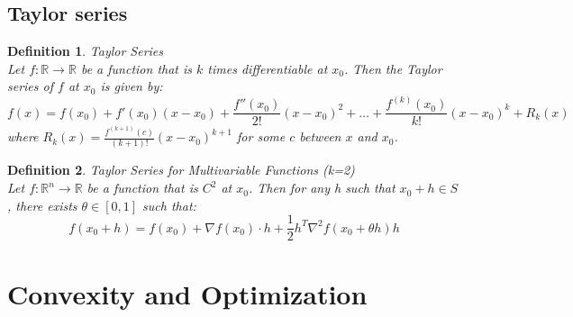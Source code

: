 \documentclass[11pt]{book} %
\newtheorem{definition}{Definition}[section]
\begin{document}
\section{Taylor series}
\begin{definition}{Taylor Series} \\
Let $f: \mathbb{R} \rightarrow \mathbb{R}$ be a function that is $k$ times differentiable at $x_0$. Then the Taylor series of $f$ at $x_0$ is given by:
\begin{equation}
    f(x) = f(x_0) + f'(x_0)(x-x_0) + \frac{f''(x_0)}{2!}(x-x_0)^2 + \ldots + \frac{f^{(k)}(x_0)}{k!}(x-x_0)^k + R_k(x)
\end{equation}
where $R_k(x) = \frac{f^{(k+1)}(c)}{(k+1)!}(x-x_0)^{k+1}$ for some $c$ between $x$ and $x_0$.
\end{definition}

\bigbreak

\begin{definition}{Taylor Series for Multivariable Functions (k=2) } \\
Let $f: \mathbb{R}^n \rightarrow \mathbb{R}$ be a function that is $C^2$ at $x_0$. Then for any h such that $x_0 + h \in S$, there exists $\theta \in [0,1]$ such that:
\begin{equation}
    f(x_0 + h) = f(x_0) + \nabla f(x_0) \cdot h + \frac{1}{2} h^T \nabla^2 f(x_0 + \theta h) h
\end{equation}
\end{definition}



\chapter{Convexity and Optimization}
\end{document}
